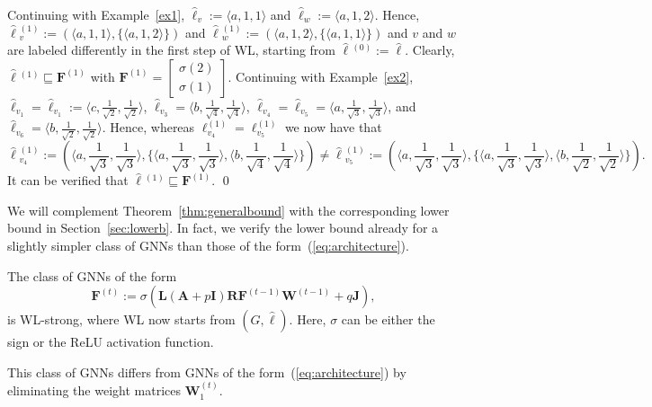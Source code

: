 \begin{example}\label{ex3}\normalfont
	Continuing with Example~\ref{ex1}, $\hat{\pmb{\ell}}_v:=\langle a,1,1\rangle$ and $\hat{\pmb{\ell}}_w:=\langle a,1,2\rangle$. Hence, $\hat{\pmb{\ell}}{}^{(1)}_v:=(\langle a,1,1\rangle,\{\langle a,1,2\rangle\})$ and $\hat{\pmb{\ell}}{}^{(1)}_w:=(\langle a,1,2\rangle,\{\langle a,1,1\rangle\})$ and $v$ and $w$ are labeled differently in the first step of WL, starting from $\hat{\pmb{\ell}}{}^{(0)}:=\hat{\pmb{\ell}}$. Clearly,
	$\hat{\pmb{\ell}}{}^{(1)}\sqsubseteq \mathbf{F}^{(1)}$ with $\mathbf{F}^{(1)}=\left[\begin{smallmatrix}\sigma(2)\\\sigma(1)\end{smallmatrix}\right]$.
	Continuing with Example~\ref{ex2}, 
$\hat{\pmb{\ell}}_{v_1}=\hat{\pmb{\ell}}_{v_1}:=\langle c, \frac{1}{\sqrt{2}},\frac{1}{\sqrt{2}}\rangle$,
 $\hat{\pmb{\ell}}_{v_3}=\langle b, \frac{1}{\sqrt{4}},\frac{1}{\sqrt{4}}\rangle$, $\hat{\pmb{\ell}}_{v_4}=\hat{\pmb{\ell}}_{v_5}=\langle a, \frac{1}{\sqrt{3}},\frac{1}{\sqrt{3}}\rangle$, and $\hat{\pmb{\ell}}_{v_6}=\langle b,\frac{1}{\sqrt{2}},\frac{1}{\sqrt{2}}\rangle$. Hence, whereas $\pmb{\ell}^{(1)}_{v_4}=\pmb{\ell}^{(1)}_{v_5}$ we now have that
$$
\hat{\pmb{\ell}}{}^{(1)}_{v_4}:=(\langle a, \frac{1}{\sqrt{3}},\frac{1}{\sqrt{3}}\rangle,\{
\langle a, \frac{1}{\sqrt{3}},\frac{1}{\sqrt{3}}\rangle,\langle b, \frac{1}{\sqrt{4}},\frac{1}{\sqrt{4}}\rangle\})
\neq
\hat{\pmb{\ell}}{}^{(1)}_{v_5}:=(\langle a, \frac{1}{\sqrt{3}},\frac{1}{\sqrt{3}}\rangle,\{
\langle a, \frac{1}{\sqrt{3}},\frac{1}{\sqrt{3}}\rangle,\langle b, \frac{1}{\sqrt{2}},\frac{1}{\sqrt{2}}\rangle\}).
$$	It can be verified that $\hat{\pmb{\ell}}{}^{(1)}\sqsubseteq \mathbf{F}^{(1)}$.
	\qed
\end{example}

We will complement Theorem~\ref{thm:generalbound}  with the corresponding lower bound in Section~\ref{sec:lowerb}. In fact, we verify the lower bound already for a slightly simpler class of GNNs than those of the form~(\ref{eq:architecture}).
\begin{theorem}\label{thm:lowerb_general}
The class of GNNs of the form 
\begin{equation}
\mathbf{F}^{(t)}:=\sigma\left(\mathbf{L}(\mathbf{A}+p\mathbf{I})\mathbf{R}\mathbf{F}^{(t-1)}\mathbf{W}^{(t-1)} + q\mathbf{J}\right), \label{eq:architecture_lb}
\end{equation}
is WL-strong, where WL now starts from $(G,\hat{\pmb{\ell}})$. Here, $\sigma$ can be either the sign or the ReLU activation function.
\end{theorem}
This class of GNNs differs from GNNs of the form~(\ref{eq:architecture}) by eliminating  the weight matrices $\mathbf{W}_1^{(t)}$.


